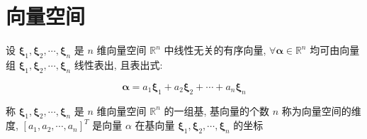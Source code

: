 \section{向量空间}
\begin{definition}[向量空间]
	设 $\boldsymbol{\xi}_{1},\boldsymbol{\xi}_{2},\cdots,\boldsymbol{\xi}_{n}$ 是 $n$ 维向量空间 $\mathbb{R}^{n}$ 中线性无关的有序向量,
	$\forall \boldsymbol{\alpha}\in \mathbb{R}^{n}$ 均可由向量组 $\boldsymbol{\xi}_{1},\boldsymbol{\xi}_{2},\cdots,\boldsymbol{\xi}_{n}$ 线性表出, 且表出式:  
	
	$$\boldsymbol{\alpha} = a_{1}\boldsymbol{\xi}_{1} + a_{2}\boldsymbol{\xi}_{2} + \cdots + a_{n}\boldsymbol{\xi}_{n}$$
	
	称 $\boldsymbol{\xi}_{1},\boldsymbol{\xi}_{2},\cdots,\boldsymbol{\xi}_{n}$ 是 $n$ 维向量空间 $\mathbb{R}^{n}$ 的一组基,
	基向量的个数 $n$ 称为向量空间的维度, $[a_{1},a_{2},\cdots,a_{n}]^{T}$ 是向量 $\alpha$ 在基向量 $\boldsymbol{\xi}_{1},\boldsymbol{\xi}_{2},\cdots,\boldsymbol{\xi}_{n}$ 的坐标
\end{definition}

